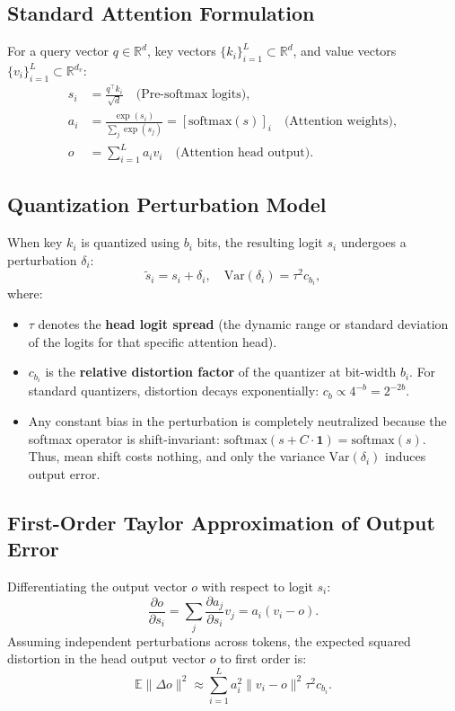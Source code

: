 \subsection{Standard Attention Formulation}
For a query vector $q \in \mathbb{R}^d$, key vectors $\{k_i\}_{i=1}^L \subset \mathbb{R}^d$, and value vectors $\{v_i\}_{i=1}^L \subset \mathbb{R}^{d_v}$:
\begin{align}
    s_i &= \frac{q^\top k_i}{\sqrt{d}} \quad \text{(Pre-softmax logits)}, \\
    a_i &= \frac{\exp(s_i)}{\sum_j \exp(s_j)} = [\mathrm{softmax}(s)]_i \quad \text{(Attention weights)}, \\
    o &= \sum_{i=1}^L a_i v_i \quad \text{(Attention head output)}.
\end{align}

\subsection{Quantization Perturbation Model}
When key $k_i$ is quantized using $b_i$ bits, the resulting logit $s_i$ undergoes a perturbation $\delta_i$:
\begin{equation}
    \tilde{s}_i = s_i + \delta_i, \quad \mathrm{Var}(\delta_i) = \tau^2 c_{b_i},
\end{equation}
where:
\begin{itemize}
    \item $\tau$ denotes the \textbf{head logit spread} (the dynamic range or standard deviation of the logits for that specific attention head).
    \item $c_{b_i}$ is the \textbf{relative distortion factor} of the quantizer at bit-width $b_i$. For standard quantizers, distortion decays exponentially: $c_b \propto 4^{-b} = 2^{-2b}$.
    \item Any constant bias in the perturbation is completely neutralized because the softmax operator is shift-invariant: $\mathrm{softmax}(s + C \cdot \mathbf{1}) = \mathrm{softmax}(s)$. Thus, mean shift costs nothing, and only the variance $\mathrm{Var}(\delta_i)$ induces output error.
\end{itemize}

\subsection{First-Order Taylor Approximation of Output Error}
Differentiating the output vector $o$ with respect to logit $s_i$:
\begin{equation}
    \frac{\partial o}{\partial s_i} = \sum_{j} \frac{\partial a_j}{\partial s_i} v_j = a_i (v_i - o).
\end{equation}
Assuming independent perturbations across tokens, the expected squared distortion in the head output vector $o$ to first order is:
\begin{equation}
    \label{eq:distortion}
    \mathbb{E}\|\Delta o\|^2 \approx \sum_{i=1}^L a_i^2 \|v_i - o\|^2 \tau^2 c_{b_i}.
\end{equation}

